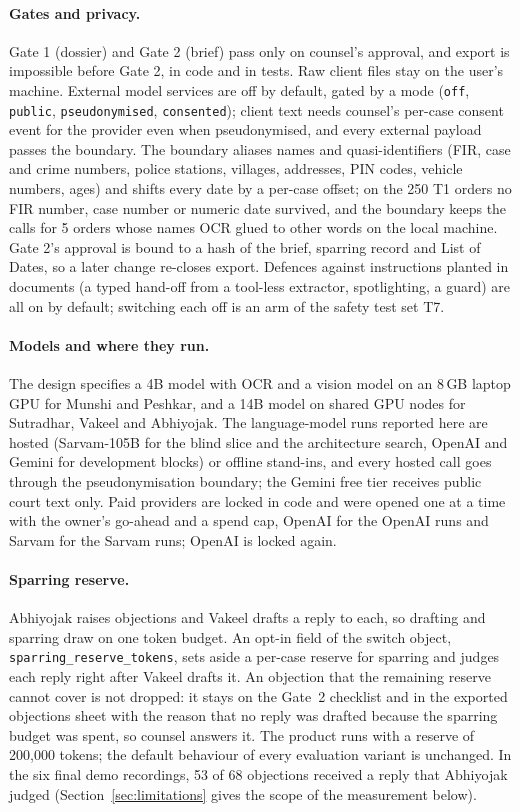 \paragraph{Gates and privacy.} Gate 1 (dossier) and Gate 2 (brief) pass only on counsel's approval, and export is impossible before Gate 2, in code and in tests. Raw client files stay on the user's machine. External model services are off by default, gated by a mode (\texttt{off}, \texttt{public}, \texttt{pseudonymised}, \texttt{consented}); client text needs counsel's per-case consent event for the provider even when pseudonymised, and every external payload passes the boundary. The boundary aliases names and quasi-identifiers (FIR, case and crime numbers, police stations, villages, addresses, PIN codes, vehicle numbers, ages) and shifts every date by a per-case offset; on the 250 T1 orders no FIR number, case number or numeric date survived, and the boundary keeps the calls for 5 orders whose names OCR glued to other words on the local machine. Gate 2's approval is bound to a hash of the brief, sparring record and List of Dates, so a later change re-closes export. Defences against instructions planted in documents (a typed hand-off from a tool-less extractor, spotlighting, a guard) are all on by default; switching each off is an arm of the safety test set T7.

\paragraph{Models and where they run.} The design specifies a 4B model with OCR and a vision model on an 8\,GB laptop GPU for Munshi and Peshkar, and a 14B model on shared GPU nodes for Sutradhar, Vakeel and Abhiyojak. The language-model runs reported here are hosted (Sarvam-105B for the blind slice and the architecture search, OpenAI and Gemini for development blocks) or offline stand-ins, and every hosted call goes through the pseudonymisation boundary; the Gemini free tier receives public court text only. Paid providers are locked in code and were opened one at a time with the owner's go-ahead and a spend cap, OpenAI for the OpenAI runs and Sarvam for the Sarvam runs; OpenAI is locked again.

\paragraph{Sparring reserve.} Abhiyojak raises objections and Vakeel drafts a reply to each, so drafting and sparring draw on one token budget. An opt-in field of the switch object, \texttt{sparring\_reserve\_tokens}, sets aside a per-case reserve for sparring and judges each reply right after Vakeel drafts it. An objection that the remaining reserve cannot cover is not dropped: it stays on the Gate~2 checklist and in the exported objections sheet with the reason that no reply was drafted because the sparring budget was spent, so counsel answers it. The product runs with a reserve of 200{,}000 tokens; the default behaviour of every evaluation variant is unchanged. In the six final demo recordings, 53 of 68 objections received a reply that Abhiyojak judged (Section~\ref{sec:limitations} gives the scope of the measurement below).

